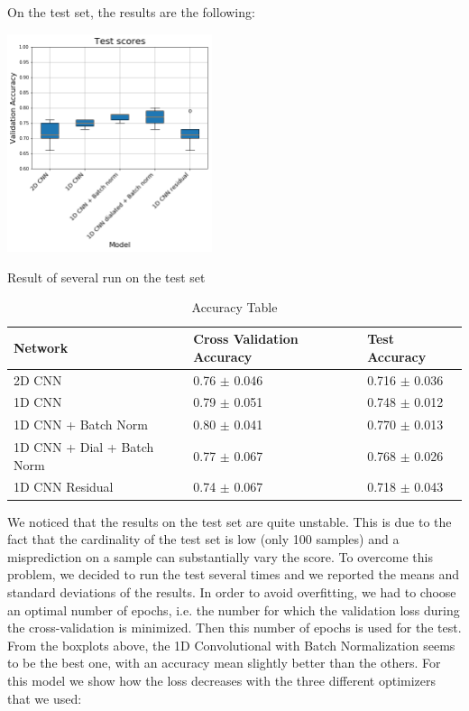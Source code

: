 \documentclass[10pt,conference,compsocconf]{IEEEtran}
\begin{document}
On the test set, the results are the following:

\begin{center}
	\captionsetup{type=figure}
	\includegraphics[width=0.45\textwidth]{img/TestVal.png}
	\caption {Result of several run on the test set}
	\label{fig:CrossVal}
\end{center}

\begin{table}[H]
	\caption{Accuracy Table}
	\label{tab:accuracy}
	\begin{tabular}{ | p{3cm} |  p{2cm} |  p{2.1cm} | }
		\hline
		Network & Cross Validation Accuracy & Test Accuracy\\
		\hline
		2D CNN
		& 0.76 $\pm$ 0.046 & 0.716 $\pm$ 0.036\\
		\hline
		1D CNN
		& 0.79 $\pm$ 0.051 & 0.748 $\pm$ 0.012\\
		\hline
		1D CNN + Batch Norm
		& 0.80 $\pm$ 0.041 & 0.770 $\pm$ 0.013\\
		\hline
		1D CNN + Dial + Batch Norm
		& 0.77 $\pm$ 0.067 & 0.768 $\pm$ 0.026\\
		\hline
		1D CNN Residual
		& 0.74 $\pm$ 0.067 & 0.718 $\pm$ 0.043\\
		\hline
	\end{tabular}
\end{table}

We noticed that the results on the test set are quite unstable. This is due to the fact that the cardinality of the test set is low (only 100 samples) and a misprediction on a sample can substantially vary the score. To overcome this problem, we decided to run the test several times and we reported the means and standard deviations of the results. In order to avoid overfitting, we had to choose an optimal number of epochs, i.e. the number for which the validation loss during the cross-validation is minimized. Then this number of epochs is used for the test.\\
From the boxplots above, the 1D Convolutional with Batch Normalization seems to be the best one, with an accuracy mean slightly better than the others. For this model we show how the loss decreases with the three different optimizers that we used:
\end{document}
